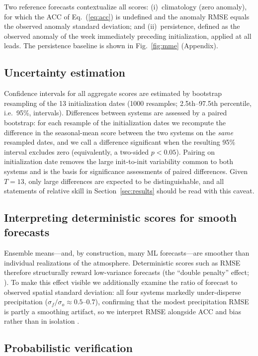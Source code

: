 \documentclass[11pt,a4paper]{article}
\begin{document}
Two reference forecasts contextualize all scores: (i)~climatology
(zero anomaly), for which the ACC of Eq.~(\ref{eq:acc}) is undefined
and the anomaly RMSE equals the observed anomaly standard deviation;
and (ii)~persistence, defined as the observed anomaly of the week
immediately preceding initialization, applied at all leads.
The persistence baseline is shown in Fig.~\ref{fig:mme} (Appendix).

\subsection{Uncertainty estimation}\label{sec:uncertainty}

Confidence intervals for all aggregate scores are estimated by
bootstrap resampling of the 13 initialization dates (1000 resamples;
2.5th--97.5th percentile, i.e.\ 95\%, intervals). Differences between
systems are assessed by a paired bootstrap: for each resample of the
initialization dates we recompute the difference in the seasonal-mean
score between the two systems on the \emph{same} resampled dates, and we
call a difference significant when the resulting 95\% interval excludes
zero (equivalently, a two-sided $p<0.05$). Pairing on initialization date
removes the large init-to-init variability common to both systems and is
the basis for significance assessments of paired differences. Given
$T=13$, only large differences are expected to be distinguishable, and
all statements of relative skill in Section~\ref{sec:results} should be
read with this caveat.

\subsection{Interpreting deterministic scores for smooth forecasts}
\label{sec:smoothing}

Ensemble means---and, by construction, many ML forecasts---are
smoother than individual realizations of the atmosphere. Deterministic
scores such as RMSE therefore structurally reward low-variance
forecasts (the ``double penalty'' effect;
\citealp{wilks2019,benbouallegue2024}). To make this effect visible we
additionally examine the ratio of forecast to observed spatial standard
deviation: all four systems markedly under-disperse precipitation
($\sigma_f/\sigma_o\approx0.5$--0.7), confirming that the modest
precipitation RMSE is partly a smoothing artifact, so we interpret RMSE
alongside ACC and bias rather than in isolation \citep{murphy1988}.

\subsection{Probabilistic verification}\label{sec:prob_methods}
\end{document}

